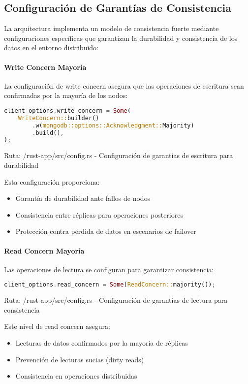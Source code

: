 \documentclass[12pt,letterpaper]{article}
\begin{document}
\subsection{Configuración de Garantías de Consistencia}
La arquitectura implementa un modelo de consistencia fuerte mediante configuraciones específicas que garantizan la durabilidad y consistencia de los datos en el entorno distribuido:

\paragraph{Write Concern Mayoría}
La configuración de write concern asegura que las operaciones de escritura sean confirmadas por la mayoría de los nodos:

\begin{lstlisting}[language=rust]
client_options.write_concern = Some(
    WriteConcern::builder()
        .w(mongodb::options::Acknowledgment::Majority)
        .build(),
);
\end{lstlisting}
\small{Ruta: /rust-app/src/config.rs - Configuración de garantías de escritura para durabilidad}

Esta configuración proporciona:
\begin{itemize}
    \item Garantía de durabilidad ante fallos de nodos
    \item Consistencia entre réplicas para operaciones posteriores
    \item Protección contra pérdida de datos en escenarios de failover
\end{itemize}

\paragraph{Read Concern Mayoría}
Las operaciones de lectura se configuran para garantizar consistencia:

\begin{lstlisting}[language=rust]
client_options.read_concern = Some(ReadConcern::majority());
\end{lstlisting}
\small{Ruta: /rust-app/src/config.rs - Configuración de garantías de lectura para consistencia}

Este nivel de read concern asegura:
\begin{itemize}
    \item Lecturas de datos confirmados por la mayoría de réplicas
    \item Prevención de lecturas sucias (dirty reads)
    \item Consistencia en operaciones distribuidas
\end{itemize}
\end{document}

